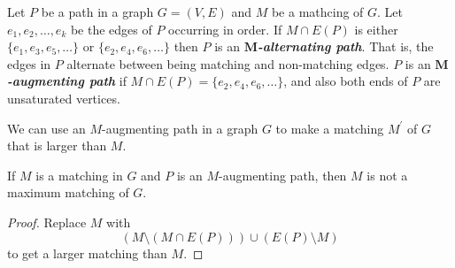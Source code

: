 \begin{defbox}
    \begin{definition}
        Let $ P $ be a path in a graph $ G=(V,E) $ and $ M $ be a mathcing of $ G $. Let
        $ e_1,e_2,\ldots ,e_k $ be the edges of $ P $ occurring in order. If $ M\cap E(P) $
        is either $ \{e_1,e_3,e_5,\ldots \} $ or $ \{e_2,e_4,e_6,\ldots\} $ then $ P $
        is an \textbf{\emph{$ \bm{M} $-alternating path}}. That is, the edges in $ P $
        alternate between being matching and non-matching edges. $ P $
        is an \textbf{\emph{$ \bm{M} $-augmenting path}} if $ M\cap E(P)=\{e_2,e_4,e_6,\ldots \} $,
        and also both ends of $ P $ are unsaturated vertices.
    \end{definition}
\end{defbox}
We can use an $ M $-augmenting path in a graph $ G $ to make a matching $ M^\prime $
of $ G $ that is larger than $ M $.

\begin{thmbox}
    \begin{prop}
        If $ M $ is a matching in $ G $ and $ P $ is an $ M $-augmenting path, then $ M $
        is not a maximum matching of $ G $.
    \end{prop}
\end{thmbox}
\begin{proof}
    Replace $ M $ with
    \[ \left( M\setminus (M\cap E(P)) \right)\cup (E(P)\setminus M) \]
    to get a larger matching than $ M $.
\end{proof}


